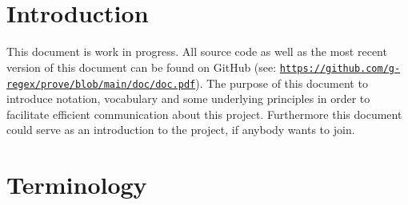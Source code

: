 \documentclass[british]{article}
\title{\name\ }
\begin{document}
\maketitle

\section{Introduction}

This document is work in progress. All source code as well as the most recent version of this document can be found on GitHub (see: \href{https://github.com/g-regex/prove/blob/main/doc/doc.pdf}{\texttt{https://github.com/g-regex/prove/blob/main/doc/doc.pdf}}). The purpose of this document to introduce
notation, vocabulary and some underlying principles in order to facilitate
efficient communication about this project. Furthermore this document
could serve as an introduction to the project, if anybody wants to
join.

\pagebreak{}

\section{Terminology}
\end{document}
